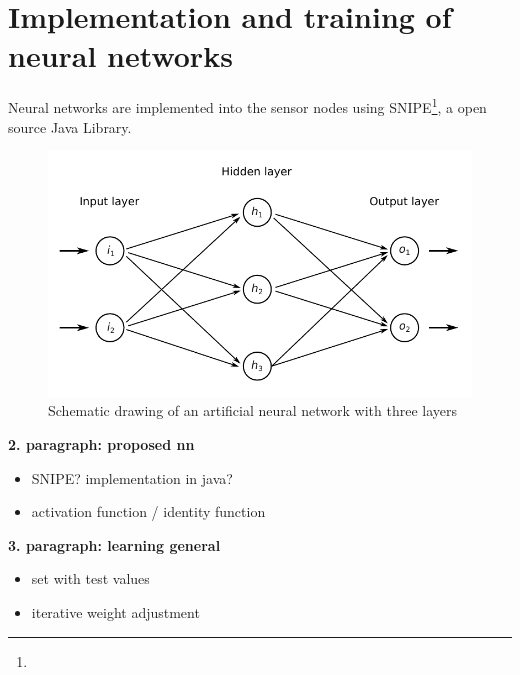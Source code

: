 \documentclass[12pt,a4paper]{scrartcl}
\begin{document}
\section*{Implementation and training of neural networks}

Neural networks are implemented into the sensor nodes using SNIPE\footnote{}, a open source Java Library.
\begin{figure}[ht]
    \centering
    \includegraphics{figures/neuralnetwork.pdf}
    \caption{Schematic drawing of an artificial neural network with three layers}
    \label{fig:neuralnetwork}
\end{figure}



\textbf{2. paragraph: proposed nn}

\begin{itemize}
\item SNIPE? implementation in java?
\item activation function / identity function
\end{itemize}

\textbf{3. paragraph: learning general}

\begin{itemize}
\item set with test values
\item iterative weight adjustment
\end{itemize}
\end{document}
